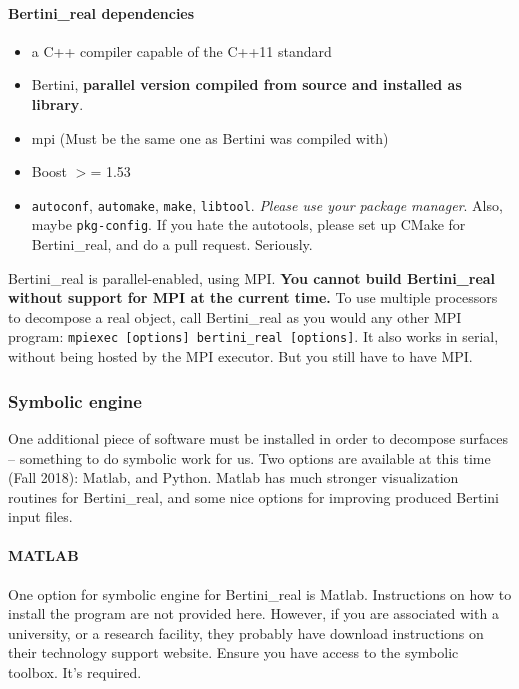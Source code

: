 \paragraph{Bertini\_real dependencies}

\begin{itemize}[noitemsep]
\item a C++ compiler capable of the C++11 standard
\item Bertini, {\bf parallel version compiled from source and installed as library}.
\item \gls{mpi} (Must be the same one as Bertini was compiled with)
\item Boost $>$= 1.53
\item {\tt autoconf}, {\tt automake}, {\tt make}, {\tt libtool}.  {\em Please use your package manager}.  Also, maybe {\tt pkg-config}.  If you hate the autotools, please set up CMake for Bertini\_real, and do a pull request.  Seriously.
\end{itemize} 



Bertini\_real is parallel-enabled, using MPI.  {\bf You cannot build Bertini\_real without support for MPI at the current time.}  To use multiple processors to decompose a real object, call Bertini\_real as you would any other MPI program: \texttt{mpiexec [options] bertini\_real [options]}.  It also works in serial, without being hosted by the MPI executor.  But you still have to have MPI.  


\subsubsection{Symbolic engine}

One additional piece of software must be installed in order to decompose surfaces -- something to do symbolic work for us.  Two options are available at this time (Fall 2018):  Matlab, and Python.  Matlab has much stronger visualization routines for Bertini\_real, and some nice options for improving produced Bertini input files.

	\paragraph*{MATLAB}
One option for symbolic engine for Bertini\_real is Matlab.  Instructions on how to install the program are not provided here. However, if you are associated with a university, or a research facility, they probably have download instructions on their technology support website.   Ensure you have access to the symbolic toolbox.  It's required.

